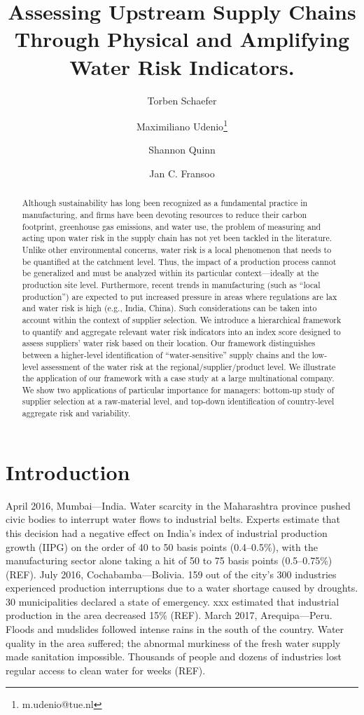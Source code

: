 \documentclass[a4paper]{article}
\title{Assessing Upstream Supply Chains Through Physical and Amplifying Water Risk Indicators.}
\author{Torben Schaefer}
\author{Maximiliano Udenio\thanks{m.udenio@tue.nl} }
\author{Shannon Quinn}
\author{Jan C. Fransoo}
\affil{Department of Industrial Engineering, Eindhoven University of Technology, 5600 MB Eindhoven, The Netherlands}
\date{}
\begin{document}
\sloppy %

\maketitle

\begin{abstract}
Although sustainability has long been recognized as a fundamental practice in manufacturing, and firms have been devoting resources to reduce their carbon footprint, greenhouse gas emissions, and water use, the problem of measuring and acting upon water risk in the supply chain has not yet been tackled in the literature. 
Unlike other environmental concerns, water risk is a local phenomenon that needs to be quantified at the catchment level.  
Thus, the impact of a production process cannot be generalized and must be analyzed within its particular context---ideally at the production site level.
Furthermore, recent trends in manufacturing (such as ``local production'') are expected to put increased pressure in areas where regulations are lax and water risk is high (e.g., India, China).
Such considerations can be taken into account within the context of supplier selection.
We introduce a hierarchical framework to quantify and aggregate relevant water risk indicators into an index score designed to assess suppliers' water risk based on their location. 
Our framework distinguishes between a higher-level identification of ``water-sensitive'' supply chains and the low-level assessment of the water risk at the regional/supplier/product level. 
We illustrate the application of our framework with a case study at a large multinational company. 
We show two applications of particular importance for managers: bottom-up study of supplier selection at a raw-material level, and top-down identification of country-level aggregate risk and variability.
\end{abstract}

\section{Introduction}
April 2016, Mumbai---India. 
Water scarcity in the Maharashtra province pushed civic bodies to interrupt water flows to industrial belts. 
Experts estimate that this decision had a negative effect on India's index of industrial production growth (IIPG) on the order of 40 to 50 basis points (0.4--0.5\%), with the manufacturing sector alone taking a hit of 50 to 75 basis points (0.5--0.75\%) (REF).
July 2016, Cochabamba---Bolivia. 
159 out of the city's 300 industries experienced production interruptions due to a water shortage caused by droughts. 
30 municipalities declared a state of emergency. 
xxx estimated that industrial production in the area decreased 15\% (REF). 
March 2017, Arequipa---Peru. 
Floods and mudslides followed intense rains in the south of the country. 
Water quality in the area suffered; the abnormal murkiness of the fresh water supply made sanitation impossible. 
Thousands of people and dozens of industries lost regular access to clean water for weeks (REF).
\end{document}
